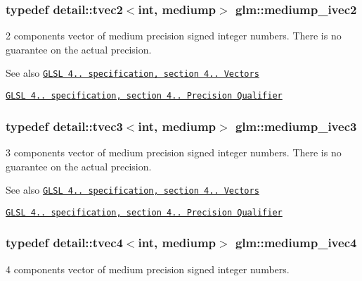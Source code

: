 \subsubsection[{\texorpdfstring{mediump\+\_\+ivec2}{mediump_ivec2}}]{\setlength{\rightskip}{0pt plus 5cm}typedef detail\+::tvec2$<$int, mediump$>$ {\bf glm\+::mediump\+\_\+ivec2}}\hypertarget{group__core__precision_ga4f1bf9844e667805235823afe809aa73}{}\label{group__core__precision_ga4f1bf9844e667805235823afe809aa73}
2 components vector of medium precision signed integer numbers. There is no guarantee on the actual precision.

\begin{DoxySeeAlso}{See also}
\href{http://www.opengl.org/registry/doc/GLSLangSpec.4.20.8.pdf}{\tt G\+L\+SL 4.. specification, section 4.. Vectors} 

\href{http://www.opengl.org/registry/doc/GLSLangSpec.4.20.8.pdf}{\tt G\+L\+SL 4.. specification, section 4.. Precision Qualifier} 
\end{DoxySeeAlso}
\subsubsection[{\texorpdfstring{mediump\+\_\+ivec3}{mediump_ivec3}}]{\setlength{\rightskip}{0pt plus 5cm}typedef detail\+::tvec3$<$int, mediump$>$ {\bf glm\+::mediump\+\_\+ivec3}}\hypertarget{group__core__precision_ga520d24fa0ea887284b80a02c062ca7b8}{}\label{group__core__precision_ga520d24fa0ea887284b80a02c062ca7b8}
3 components vector of medium precision signed integer numbers. There is no guarantee on the actual precision.

\begin{DoxySeeAlso}{See also}
\href{http://www.opengl.org/registry/doc/GLSLangSpec.4.20.8.pdf}{\tt G\+L\+SL 4.. specification, section 4.. Vectors} 

\href{http://www.opengl.org/registry/doc/GLSLangSpec.4.20.8.pdf}{\tt G\+L\+SL 4.. specification, section 4.. Precision Qualifier} 
\end{DoxySeeAlso}
\subsubsection[{\texorpdfstring{mediump\+\_\+ivec4}{mediump_ivec4}}]{\setlength{\rightskip}{0pt plus 5cm}typedef detail\+::tvec4$<$int, mediump$>$ {\bf glm\+::mediump\+\_\+ivec4}}\hypertarget{group__core__precision_gaa4c23a132d76436e041747b0c03265ad}{}\label{group__core__precision_gaa4c23a132d76436e041747b0c03265ad}
4 components vector of medium precision signed integer numbers.

